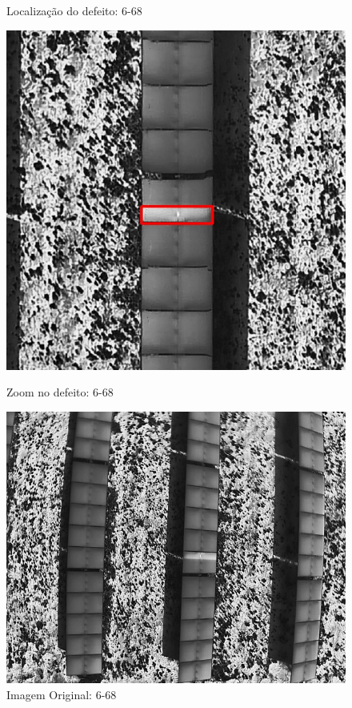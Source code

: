 \documentclass[dvipsnames]{article}%
\begin{document}
\begin{figure}[h!]
\begin{minipage}{0.31\linewidth}
\caption{Localização do defeito: 6-68}%
\end{minipage}%
\hfill%
\begin{minipage}{0.31\linewidth}%
\centering%
\centering%
\includegraphics[width=\linewidth]{report_images/faultydiodes_6-68_cropped.jpg}%
\caption{Zoom no defeito: 6-68}%
\end{minipage}%
\hfill%
\begin{minipage}{0.31\linewidth}%
\centering%
\centering%
\includegraphics[width=\linewidth]{report_images/faultydiodes_6-68.jpg}%
\caption{Imagem Original: 6-68}%
\end{minipage}%
\end{figure}
\end{document}
